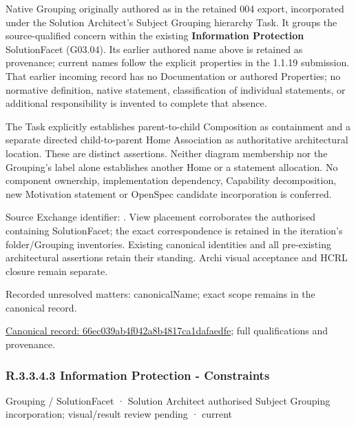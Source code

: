 Native Grouping originally authored as \texttt{} in the retained 004 export,
incorporated under the Solution Architect's Subject Grouping hierarchy Task.
It groups the source-qualified \texttt{} concern within
the existing \textbf{Information Protection} SolutionFacet (G03.04). Its earlier authored name above is retained as provenance; current names
follow the explicit properties in the 1.1.19 submission.
That earlier incoming record has no Documentation or authored Properties; no normative
definition, native statement, classification of individual statements, or
additional responsibility is invented to complete that absence.



The Task explicitly establishes parent-to-child Composition as containment and
a separate directed child-to-parent Home Association as authoritative architectural
location. These are distinct assertions. Neither diagram membership nor the
Grouping's label alone establishes another Home or a statement allocation.
No component ownership, implementation dependency, Capability decomposition,
new Motivation statement or OpenSpec candidate incorporation is conferred.



Source Exchange identifier: \texttt{}. View placement corroborates
the authorised containing SolutionFacet; the exact correspondence is retained in the
iteration's folder/Grouping inventories. Existing canonical identities and all
pre-existing architectural assertions retain their standing. Archi visual
acceptance and HCRL closure remain separate.


{\small Recorded unresolved matters: canonicalName; exact scope remains in the canonical record.}\par
{\footnotesize \href{../../../../../../../continuum/grouping/66ec039ab4f042a8b4817ca1dafaedfe.md}{Canonical record: 66ec039ab4f042a8b4817ca1dafaedfe}; full qualifications and provenance.}\par
\subsubsection*{R.3.3.4.3 Information Protection - Constraints}
\label{navigation:R.3.3.4.3}

\label{element:a49c1e5afd224d12bae33fac366a1d37}
{\small Grouping / SolutionFacet · Solution Architect authorised Subject Grouping incorporation; visual/result review pending · current}\par

